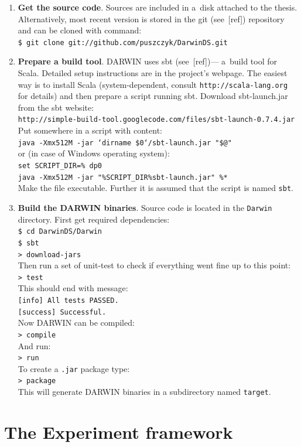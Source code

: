 \begin{enumerate}

\item \textbf{Get the source code}. Sources are included in a~disk attached to
  the thesis. Alternatively, most recent version is stored in the git
  (see~[ref]) repository and can be cloned with command:\\
  \texttt{\$ git clone git://github.com/puszczyk/DarwinDS.git}
\item \textbf{Prepare a build tool}. DARWIN uses sbt (see~[ref])--- a~build
  tool for Scala. Detailed setup instructions are in the project's
  webpage. The easiest way is to install Scala (system-dependent, consult
  \texttt{http://scala-lang.org} for details) and then prepare a script
  running sbt. Download sbt-launch.jar from the sbt website: \\
  \texttt{http://simple-build-tool.googlecode.com/files/sbt-launch-0.7.4.jar}
  \\
  Put somewhere in  a script with content: \\
  \texttt{java -Xmx512M -jar `dirname \$0`/sbt-launch.jar "\$@"} \\
  or (in case of Windows operating system): \\
  \texttt{set SCRIPT\_DIR=\%~dp0} \\
  \texttt{java -Xmx512M -jar "\%SCRIPT\_DIR\%sbt-launch.jar" \%*} \\
  Make the file executable. Further it is assumed that the script is named
  \texttt{sbt}.
\item \textbf{Build the DARWIN binaries}. Source code is located in the
  \texttt{Darwin} directory. First get required dependencies: \\
  \texttt{\$ cd DarwinDS/Darwin} \\
  \texttt{\$ sbt} \\
  \texttt{> download-jars} \\
  Then run a set of unit-test to check if everything went fine up to this
  point:\\
  \texttt{> test} \\
  This should end with message: \\
  \texttt{[info] All tests PASSED.} \\
  \texttt{[success] Successful.} \\
  Now DARWIN can be compiled: \\
  \texttt{> compile} \\
  And run: \\
  \texttt{> run} \\
  To create a \texttt{.jar} package type: \\
  \texttt{> package} \\
  This will generate DARWIN binaries in a subdirectory named \texttt{target}.
\end{enumerate}


\section*{The Experiment framework} 

